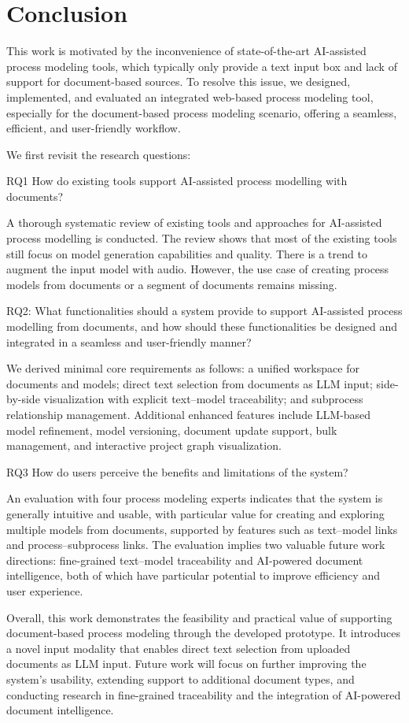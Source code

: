 \chapter{Conclusion}
\label{sec:conclusion}
This work is motivated by the inconvenience of state-of-the-art AI-assisted process modeling tools, which typically only provide a text input box and lack of support for document-based sources. To resolve this issue, we designed, implemented, and evaluated an integrated web-based process modeling tool, especially for the document-based process modeling scenario, offering a seamless, efficient, and user-friendly workflow.

We first revisit the research questions:

RQ1 How do existing tools support AI-assisted process modelling with documents?

A thorough systematic review of existing tools and approaches for AI-assisted process modelling is conducted. The review shows that most of the existing tools still focus on model generation capabilities and quality. There is a trend to augment the input model with audio. However, the use case of creating process models from documents or a segment of documents remains missing.

RQ2: What functionalities should a system provide to support AI-assisted process modelling from documents, and how should these functionalities be designed and integrated in a seamless and user-friendly manner?

We derived minimal core requirements as follows: a unified workspace for documents and models; direct text selection from documents as LLM input; side-by-side visualization with explicit text–model traceability; and subprocess relationship management.
Additional enhanced features include LLM-based model refinement, model versioning, document update support, bulk management, and interactive project graph visualization. 


RQ3 How do users perceive the benefits and limitations of the system?

An evaluation with four process modeling experts indicates that the system is generally intuitive and usable, with particular value for creating and exploring multiple models from documents, supported by features such as text–model links and process–subprocess links. The evaluation implies two valuable future work directions: fine-grained text–model traceability and AI-powered document intelligence, both of which have particular potential to improve efficiency and user experience.

Overall, this work demonstrates the feasibility and practical value of supporting document-based process modeling through the developed prototype. It introduces a novel input modality that enables direct text selection from uploaded documents as LLM input. Future work will focus on further improving the system’s usability, extending support to additional document types, and conducting research in fine-grained traceability and the integration of AI-powered document intelligence.